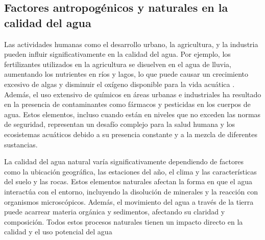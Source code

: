 

\subsection{Factores antropogénicos y naturales en  la calidad del agua}
Las actividades humanas como el desarrollo urbano, la agricultura, y la industria pueden influir significativamente en la calidad del agua. Por ejemplo, los fertilizantes utilizados en la agricultura se disuelven en el agua de lluvia, aumentando los nutrientes en ríos y lagos, lo que puede causar un crecimiento excesivo de algas y disminuir el oxígeno disponible para la vida acuática \cite{usgs}. Además, el uso extensivo de químicos en áreas urbanas e industriales ha resultado en la presencia de contaminantes como fármacos y pesticidas en los cuerpos de agua. Estos elementos, incluso cuando están en niveles que no exceden las normas de seguridad, representan un desafío complejo para la salud humana y los ecosistemas acuáticos debido a su presencia constante y a la mezcla de diferentes sustancias.

La calidad del agua natural varía significativamente dependiendo de factores como la ubicación geográfica, las estaciones del año, el clima y las características del suelo y las rocas. Estos elementos naturales afectan la forma en que el agua interactúa con el entorno, incluyendo la disolución de minerales y la reacción con organismos microscópicos. Además, el movimiento del agua a través de la tierra puede acarrear materia orgánica y sedimentos, afectando su claridad y composición. Todos estos procesos naturales tienen un impacto directo en la calidad y el uso potencial del agua \cite{usgs}

